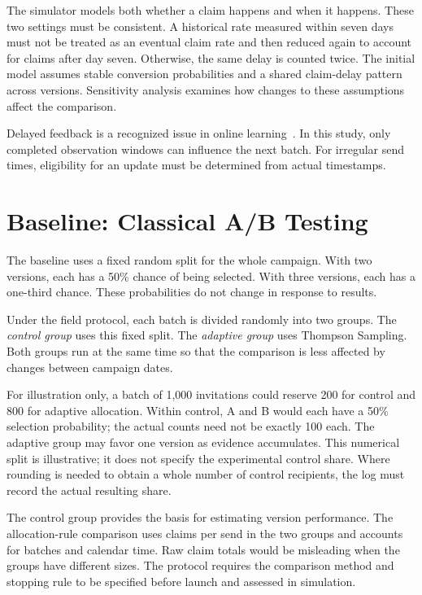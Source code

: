 The simulator models both whether a claim happens and when it happens. These two settings must be consistent. A historical rate measured within seven days must not be treated as an eventual claim rate and then reduced again to account for claims after day seven. Otherwise, the same delay is counted twice. The initial model assumes stable conversion probabilities and a shared claim-delay pattern across versions. Sensitivity analysis examines how changes to these assumptions affect the comparison.

Delayed feedback is a recognized issue in online learning~\cite{joulani2013online}. In this study, only completed observation windows can influence the next batch. For irregular send times, eligibility for an update must be determined from actual timestamps.

\section{Baseline: Classical A/B Testing}
\label{sec:method_baseline}

The baseline uses a fixed random split for the whole campaign. With two versions, each has a 50\% chance of being selected. With three versions, each has a one-third chance. These probabilities do not change in response to results.

Under the field protocol, each batch is divided randomly into two groups. The \emph{control group} uses this fixed split. The \emph{adaptive group} uses Thompson Sampling. Both groups run at the same time so that the comparison is less affected by changes between campaign dates.

For illustration only, a batch of 1,000 invitations could reserve 200 for control and 800 for adaptive allocation. Within control, A and B would each have a 50\% selection probability; the actual counts need not be exactly 100 each. The adaptive group may favor one version as evidence accumulates. This numerical split is illustrative; it does not specify the experimental control share. Where rounding is needed to obtain a whole number of control recipients, the log must record the actual resulting share.

The control group provides the basis for estimating version performance. The allocation-rule comparison uses claims per send in the two groups and accounts for batches and calendar time. Raw claim totals would be misleading when the groups have different sizes. The protocol requires the comparison method and stopping rule to be specified before launch and assessed in simulation.

